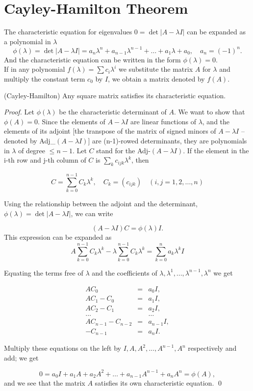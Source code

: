 \section{Cayley-Hamilton Theorem}

The characteristic equation for eigenvalues $0 = \det|{A - \lambda I |}$ can be expanded as a polynomial in $\lambda$ 
\[ \phi(\lambda) = \det{|A - \lambda I|} = a_n\lambda^n + a_{n-1}\lambda^{n-1} +\hdots + a_1 \lambda + a_0, \quad a_n = (-1)^n.\]
And the characteristic equation can be written in the form $\phi(\lambda) = 0$.\\

If in any polynomial $f(\lambda) = \sum c_i \lambda^i$ we substitute the matrix $A$ for $\lambda$ and multiply the constant term
$c_0$ by $I$, we obtain a matrix denoted by $f(A)$.

\begin{theorem} (Cayley-Hamilton) Any square matrix satisfies its characteristic equation. \end{theorem}

\begin{proof}
Let $\phi(\lambda)$ be the characteristic determinant of $A$. We want to show that $\phi(A) = 0$.  Since the elements of $A - \lambda I$ are 
linear functions of $\lambda$, and the elements of its adjoint [the transpose of the matrix of signed minors of $A-\lambda I$ -- denoted by Adj\_$(A-\lambda I)$] are (n-1)-rowed  determinants,
they are polynomials in $\lambda$ of degree $\le n-1$. Let $C$ stand for the Adj-$(A-\lambda I)$.
If the element in the i-th row and j-th column of $C$ is $\sum_k c_{ijk}\lambda^k$, then 

\[ C = \sum_{k=0}^{n-1} C_k \lambda^k, \quad C_k = (c_{ijk})\quad (i,j = 1, 2, \hdots, n) \]
 
 Using the relationship between the adjoint and the determinant, $\phi(\lambda) = \det{|A - \lambda I|}$, we can write
 
 \[ (A - \lambda I) C = \phi(\lambda) I. \] This expression can be expanded as 
 \[ A \sum_{k = 0} ^{n-1} C_k \lambda^k  - \lambda \sum_{k=0}^{n-1} C_k \lambda^k = \sum_{k=0}^n a_k \lambda^k  I \]
 
 Equating the terms free of $\lambda$ and the coefficients of $\lambda, \lambda^1, ..., \lambda^{n-1}, \lambda^n$ we get
 
 \begin{eqnarray*}
 AC_0                      &=& a_0 I,\\
 AC_1 - C_0            &=& a_1 I,\\
 AC_2 - C_1            &=& a_2 I,\\
 \hdots                     &~& \hdots \\
 AC_{n-1} - C_{n-2} &=& a_{n-1} I,\\
-C_{n-1}                  &=& a_n I.
\end{eqnarray*}

Multiply these equations on the left by $I, A, A^2, ..., A^{n-1}, A^n$ respectively and add; we get

\[ 0 = a_0 I + a_1 A + a_2 A^2 + \hdots + a_{n-1}A^{n-1} + a_n A^n = \phi(A), \] and we see that the matrix $A$ satisfies its own
characteristic equation.  \qed
\end{proof}

